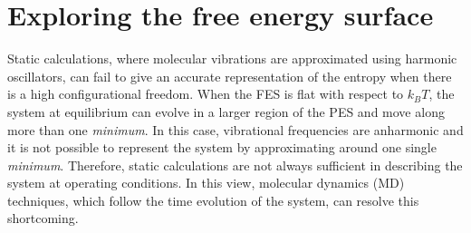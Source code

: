 \section{Exploring the free energy surface}
Static calculations, where molecular vibrations are approximated using harmonic oscillators, can fail to give an accurate representation of the entropy when there is a high configurational freedom. When the FES is flat with respect to $k_B T$, the system at equilibrium can evolve in a larger region of the PES and move along more than one \textit{minimum}. In this case, vibrational frequencies are anharmonic and it is not possible to represent the system by approximating around one single \textit{minimum}. Therefore, static calculations are not always sufficient in describing the system at operating conditions. In this view, molecular dynamics (MD) techniques, which follow the time evolution of the system, can resolve this shortcoming.

